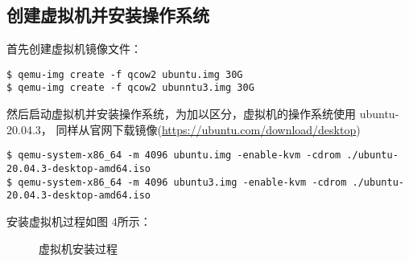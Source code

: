 \documentclass[UTF8,12pt]{ctexart}
\numberwithin{equation}{section}
\begin{document}
\subsection{创建虚拟机并安装操作系统}
首先创建虚拟机镜像文件：
\begin{lstlisting}
$ qemu-img create -f qcow2 ubuntu.img 30G
$ qemu-img create -f qcow2 ubunntu3.img 30G
\end{lstlisting}
然后启动虚拟机并安装操作系统，为加以区分，虚拟机的操作系统使用 ubuntu-20.04.3， 同样从官网下载镜像(\url{https://ubuntu.com/download/desktop})
\begin{lstlisting}[breaklines=true]
$ qemu-system-x86_64 -m 4096 ubuntu.img -enable-kvm -cdrom ./ubuntu-20.04.3-desktop-amd64.iso
$ qemu-system-x86_64 -m 4096 ubuntu3.img -enable-kvm -cdrom ./ubuntu-20.04.3-desktop-amd64.iso
\end{lstlisting}
安装虚拟机过程如图 4所示：
\begin{figure}[H]
    \centering

    \label{fig3}
    \caption{虚拟机安装过程}
\end{figure}%
\end{document}
